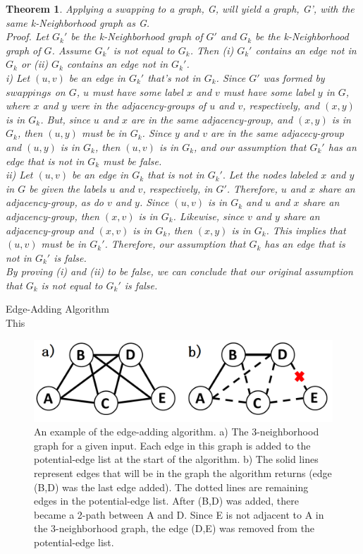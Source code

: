 \documentclass[11pt]{article}
\newtheorem{thm}{Theorem}[section]
\begin{document}
\begin{thm}  \emph{Applying a swapping to a graph, G, will yield a graph, G', with the same k-Neighborhood graph as G.}\\
\noindent \emph{Proof.} Let $G_k'$ be the k-Neighborhood graph of $G'$ and $G_k$ be the k-Neighborhood graph of $G$. Assume $G_k'$ is not equal to $G_k$. Then (i) $G_k'$ contains an edge not in $G_k$ or (ii) $G_k$ contains an edge not in $G_k'$.  \\
\indent i) Let $(u,v)$ be an edge in $G_k'$ that's not in $G_k$. Since $G'$ was formed by $swappings$ on $G$, $u$ must have some label $x$ and $v$ must have some label $y$ in $G$, where $x$ and $y$ were in the adjacency-groups of $u$ and $v$, respectively, and $(x,y)$ is in $G_k$. But, since $u$ and $x$ are in the same adjacency-group, and $(x,y)$ is in $G_k$, then $(u,y)$ must be in $G_k$. Since $y$ and $v$ are in the same adjacecy-group and $(u,y)$ is in $G_k$, then $(u,v)$ is in $G_k$, and our assumption that $G_k'$ has an edge that is not in $G_k$ must be false.\\
\indent 			ii) Let $(u,v)$ be an edge in $G_k$ that is not in $G_k'.$ Let the nodes labeled $x$ and $y$ in $G$ be given the labels $u$ and $v$, respectively, in $G'$. Therefore, $u$ and $x$ share an adjacency-group, as do $v$ and $y$.  Since $(u,v)$ is in $G_k$ and $u$ and $x$ share an adjacency-group, then $(x,v)$ is in $G_k$. Likewise, since $v$ and $y$ share an adjacency-group and $(x,v)$ is in $G_k$, then $(x,y)$ is in $G_k$. This implies that $(u,v)$ must be in $G_k'$. Therefore, our assumption that $G_k$ has an edge that is not in $G_k'$ is false. \\
By proving (i) and (ii) to be false, we can conclude that our original assumption that $G_k$ is not equal to $G_k'$ is false.\\
\end{thm}

 Edge-Adding Algorithm\\
This 

\begin{figure}[htb]
\centering
\includegraphics[scale=0.3 ]{profs_example.png}
\caption{An example of the edge-adding algorithm. a) The 3-neighborhood graph for a given input. Each edge in this graph is added to the potential-edge list at the start of the algorithm. b) The solid lines represent edges that will be in the graph the algorithm returns (edge (B,D) was the last edge added). The dotted lines are remaining edges in the potential-edge list. After (B,D) was added, there became a 2-path between A and D. Since E is not adjacent to A in the 3-neighborhood graph, the edge (D,E) was removed from the potential-edge list.}
\label{fig:profs example}
\end{figure}
\end{document}
